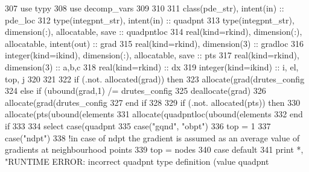 \begin{DoxyCode}
307       \textcolor{keywordtype}{use }typy
308       \textcolor{keywordtype}{use }decomp_vars
309 
310       
311       \textcolor{keywordtype}{class}(pde_str), \textcolor{keywordtype}{intent(in)} :: pde\_loc
312       \textcolor{keywordtype}{type}(integpnt_str), \textcolor{keywordtype}{intent(in)} :: quadpnt
313       \textcolor{keywordtype}{type}(integpnt_str), \textcolor{keywordtype}{dimension(:)}, \textcolor{keywordtype}{allocatable}, \textcolor{keywordtype}{save} :: quadpntloc
314       \textcolor{keywordtype}{real(kind=rkind)}, \textcolor{keywordtype}{dimension(:)}, \textcolor{keywordtype}{allocatable}, \textcolor{keywordtype}{intent(out)} :: grad
315       \textcolor{keywordtype}{real(kind=rkind)}, \textcolor{keywordtype}{dimension(3)} :: gradloc
316       \textcolor{keywordtype}{integer(kind=ikind)}, \textcolor{keywordtype}{dimension(:)}, \textcolor{keywordtype}{allocatable}, \textcolor{keywordtype}{save} :: pts
317       \textcolor{keywordtype}{real(kind=rkind)}, \textcolor{keywordtype}{dimension(3)}    :: a,b,c
318       \textcolor{keywordtype}{real(kind=rkind)} :: dx
319       \textcolor{keywordtype}{integer(kind=ikind)} :: i, el, top, j
320 
321       
322       \textcolor{keywordflow}{if} (.not. \textcolor{keyword}{allocated}(grad)) \textcolor{keywordflow}{then}
323         \textcolor{keyword}{allocate}(grad(drutes_config%
324       \textcolor{keywordflow}{else} \textcolor{keywordflow}{if} (ubound(grad,1) /= drutes_config%
325         \textcolor{keyword}{deallocate}(grad)
326         \textcolor{keyword}{allocate}(grad(drutes_config%
327 \textcolor{keywordflow}{      end if}
328       
329       \textcolor{keywordflow}{if} (.not. \textcolor{keyword}{allocated}(pts)) \textcolor{keywordflow}{then}
330         \textcolor{keyword}{allocate}(pts(ubound(elements%
331         \textcolor{keyword}{allocate}(quadpntloc(ubound(elements%
332 \textcolor{keywordflow}{      end if}
333       
334       \textcolor{keywordflow}{select case}(quadpnt%
335         \textcolor{keywordflow}{case}(\textcolor{stringliteral}{"gqnd"}, \textcolor{stringliteral}{"obpt"})
336           top = 1
337         \textcolor{keywordflow}{case}(\textcolor{stringliteral}{"ndpt"})
338           \textcolor{comment}{!in case of ndpt the gradient is assumed as an average value of gradients at neighbourhood points}
339           top = nodes%
340 \textcolor{keywordflow}{        case default}
341           print *, \textcolor{stringliteral}{"RUNTIME ERROR: incorrect quadpnt type definition (value quadpnt%
}
\end{DoxyCode}
